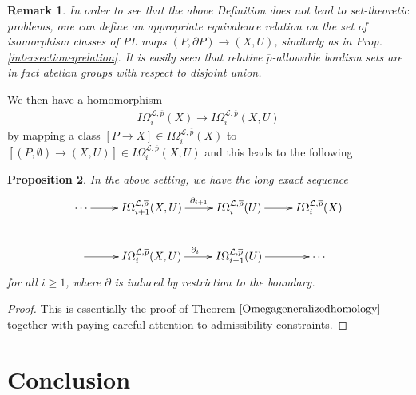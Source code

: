 \documentclass{scrreprt}
\newtheorem{prop}{Proposition}[chapter]
\newtheorem{remark}[prop]{Remark}
\begin{document}
\begin{remark}
In order to see that the above Definition does not lead to set-theoretic problems, one can define an appropriate equivalence relation on the set of isomorphism classes of PL maps $(P, \partial P) \to (X,U)$, similarly as in Prop.\ref{intersectioneqrelation}. It is easily seen that relative $\overline{p}$-allowable bordism sets are in fact abelian groups with respect to disjoint union.
\end{remark}
We then have a homomorphism
\begin{align*}
I\Omega_i^{\mathcal{L},\overline{p}}(X) \to I\Omega_i^{\mathcal{L},\overline{p}}(X,U)
\end{align*}
by mapping a class $[P \to X] \in I\Omega_i^{\mathcal{L},\overline{p}}(X)$ to $[(P,\emptyset) \to (X,U)] \in I\Omega_i^{\mathcal{L},\overline{p}}(X,U)$ and this leads to the following 
\begin{prop}
In the above setting, we have the long exact sequence
\begin{equation*}
\begin{xy}
\xymatrix{ 
\cdots \ar[r]^{}     &   I\Omega_{i+1}^{\mathcal{L},\overline{p}}(X,U) \ar[r]^{\ \ \partial_{i+1}}    &   I\Omega_i^{\mathcal{L},\overline{p}}(U) \ar[r]^{}   &  I\Omega_i^{\mathcal{L},\overline{p}}(X) \\
  \ar[r]^{}   &   I\Omega_i^{\mathcal{L},\overline{p}}(X,U)  \ar[r]^{\partial_i}   &  I\Omega_{i-1}^{\mathcal{L},\overline{p}}(U) \ar[r]^{}   &   \cdots
}
\end{xy}
\end{equation*}
for all $i \geq 1$, where $\partial$ is induced by restriction to the boundary.
\end{prop}

\begin{proof}
This is essentially the proof of Theorem $\ref{Omegageneralizedhomology}$ together with paying careful attention to admissibility constraints.
\end{proof}

\chapter{Conclusion}
\end{document}
